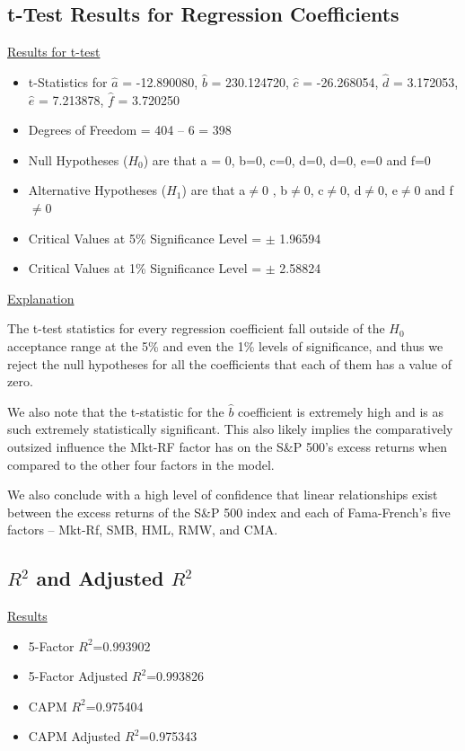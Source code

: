 \documentclass[a4paper]{article}
\begin{document}
\newpage
\subsection{t-Test Results for Regression Coefficients}
\underline{Results for t-test}
\begin{itemize}
	\item t-Statistics for $\hat{a}$ = -12.890080, $\hat{b}$ = 230.124720, $\hat{c}$ = -26.268054, $\hat{d}$ = 3.172053, $\hat{e}$ = 7.213878, $\hat{f}$ = 3.720250
	\item Degrees of Freedom = 404 – 6 = 398
	\item Null Hypotheses ($H_0$) are that a = 0, b=0, c=0, d=0, d=0, e=0 and f=0
	\item Alternative Hypotheses ($H_1$) are that a$\ne$0 , b$\ne$0, c$\ne$0, d$\ne$0, e$\ne$0 and f$\ne$0
	\item Critical Values at 5\% Significance Level = $\pm$ 1.96594
	\item Critical Values at 1\% Significance Level = $\pm$ 2.58824
\end{itemize}

\underline{Explanation}

The t-test statistics for every regression coefficient fall outside of the $H_0$ acceptance range at the 5\% and even the 1\% levels of significance, and thus we reject the null hypotheses for all the coefficients that each of them has a value of zero.

We also note that the t-statistic for the $\hat{b}$ coefficient is extremely high and is as such extremely statistically significant. This also likely implies the comparatively outsized influence the Mkt-RF factor has on the S\&P 500’s excess returns when compared to the other four factors in the model.

We also conclude with a high level of confidence that linear relationships exist between the excess returns of the S\&P 500 index and each of Fama-French’s five factors – Mkt-Rf, SMB, HML, RMW, and CMA. 

\newpage
\subsection{$R^2$ and Adjusted $R^2$}
\underline{Results}
\begin{itemize}
	\item 5-Factor $R^2$=0.993902
	\item 5-Factor Adjusted $R^2$=0.993826
	\item CAPM $R^2$=0.975404
	\item CAPM Adjusted $R^2$=0.975343
\end{itemize}
\end{document}
